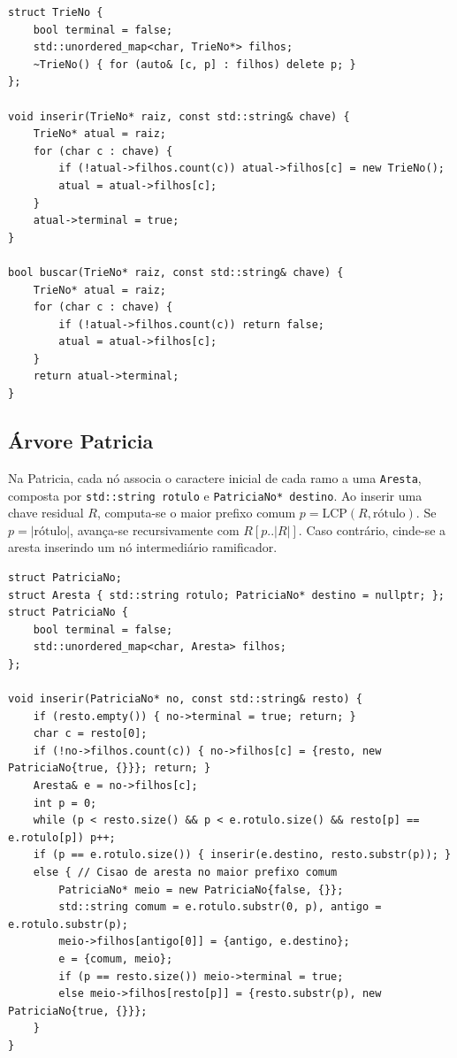 \documentclass[11pt,a4paper]{article}
\begin{document}
\begin{lstlisting}[caption={Operações nucleares de inserção e busca na Árvore Trie.},label={alg:trie}]
struct TrieNo {
    bool terminal = false;
    std::unordered_map<char, TrieNo*> filhos;
    ~TrieNo() { for (auto& [c, p] : filhos) delete p; }
};

void inserir(TrieNo* raiz, const std::string& chave) {
    TrieNo* atual = raiz;
    for (char c : chave) {
        if (!atual->filhos.count(c)) atual->filhos[c] = new TrieNo();
        atual = atual->filhos[c];
    }
    atual->terminal = true;
}

bool buscar(TrieNo* raiz, const std::string& chave) {
    TrieNo* atual = raiz;
    for (char c : chave) {
        if (!atual->filhos.count(c)) return false;
        atual = atual->filhos[c];
    }
    return atual->terminal;
}
\end{lstlisting}

\subsection{Árvore Patricia}
Na Patricia, cada nó associa o caractere inicial de cada ramo a uma \texttt{Aresta}, composta por \texttt{std::string rotulo} e \texttt{PatriciaNo* destino}. Ao inserir uma chave residual $R$, computa-se o maior prefixo comum $p = \mathrm{LCP}(R, \text{rótulo})$. Se $p = |\text{rótulo}|$, avança-se recursivamente com $R[p..|R|]$. Caso contrário, cinde-se a aresta inserindo um nó intermediário ramificador.

\begin{lstlisting}[caption={Inserção com divisão atômica de aresta na Árvore Patricia.},label={alg:patricia}]
struct PatriciaNo;
struct Aresta { std::string rotulo; PatriciaNo* destino = nullptr; };
struct PatriciaNo {
    bool terminal = false;
    std::unordered_map<char, Aresta> filhos;
};

void inserir(PatriciaNo* no, const std::string& resto) {
    if (resto.empty()) { no->terminal = true; return; }
    char c = resto[0];
    if (!no->filhos.count(c)) { no->filhos[c] = {resto, new PatriciaNo{true, {}}}; return; }
    Aresta& e = no->filhos[c];
    int p = 0;
    while (p < resto.size() && p < e.rotulo.size() && resto[p] == e.rotulo[p]) p++;
    if (p == e.rotulo.size()) { inserir(e.destino, resto.substr(p)); }
    else { // Cisao de aresta no maior prefixo comum
        PatriciaNo* meio = new PatriciaNo{false, {}};
        std::string comum = e.rotulo.substr(0, p), antigo = e.rotulo.substr(p);
        meio->filhos[antigo[0]] = {antigo, e.destino};
        e = {comum, meio};
        if (p == resto.size()) meio->terminal = true;
        else meio->filhos[resto[p]] = {resto.substr(p), new PatriciaNo{true, {}}};
    }
}
\end{lstlisting}
\end{document}
